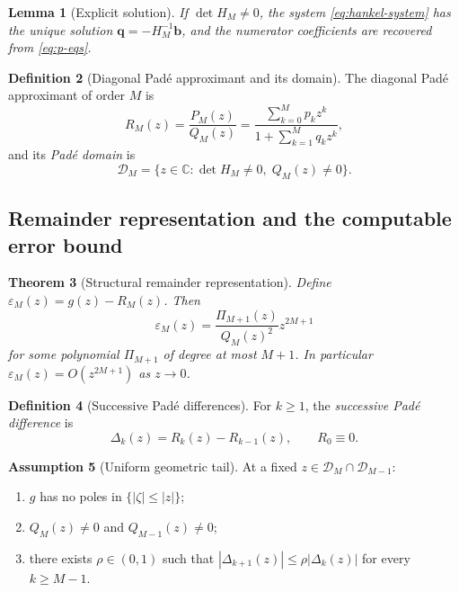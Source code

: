 \documentclass[11pt]{article}
\newtheorem{theorem}{Theorem}[section]
\newtheorem{lemma}[theorem]{Lemma}
\theoremstyle{definition}
\newtheorem{definition}[theorem]{Definition}
\newtheorem{assumption}[theorem]{Assumption}
\theoremstyle{remark}
\begin{document}
\begin{lemma}[Explicit solution]
\label{lem:explicit}
If $\det H_{M}\ne 0$, the system \eqref{eq:hankel-system} has the unique solution $\bm{q}=-H_{M}^{-1}\bm{b}$, and the numerator coefficients are recovered from \eqref{eq:p-eqs}.
\end{lemma}

\begin{definition}[Diagonal Pad\'e approximant and its domain]
\label{def:pade-domain}
The diagonal Pad\'e approximant of order $M$ is
\begin{equation}
R_{M}(z)=\frac{P_{M}(z)}{Q_{M}(z)}=\frac{\sum_{k=0}^{M}p_{k}z^{k}}{1+\sum_{k=1}^{M}q_{k}z^{k}},
\label{eq:RM}
\end{equation}
and its \emph{Pad\'e domain} is
\begin{equation}
\mathcal{D}_{M}=\{z\in\mathbb{C}:\det H_{M}\ne 0,\;Q_{M}(z)\ne 0\}.
\label{eq:DM}
\end{equation}
\end{definition}

\subsection{Remainder representation and the computable error bound}
\label{sec:heston-error}

\begin{theorem}[Structural remainder representation]
\label{thm:remainder-structure}
Define $\varepsilon_{M}(z)=g(z)-R_{M}(z)$. Then
\begin{equation}
\varepsilon_{M}(z)=\frac{\Pi_{M+1}(z)}{Q_{M}(z)^{2}}z^{2M+1}
\label{eq:remainder-structure}
\end{equation}
for some polynomial $\Pi_{M+1}$ of degree at most $M+1$. In particular $\varepsilon_{M}(z)=O(z^{2M+1})$ as $z\to 0$.
\end{theorem}

\begin{definition}[Successive Pad\'e differences]
\label{def:differences}
For $k\ge 1$, the \emph{successive Pad\'e difference} is
\begin{equation}
\Delta_{k}(z)=R_{k}(z)-R_{k-1}(z),
\qquad R_{0}\equiv 0.
\label{eq:Delta}
\end{equation}
\end{definition}

\begin{assumption}[Uniform geometric tail]
\label{ass:geometric-tail}
At a fixed $z\in\mathcal{D}_{M}\cap\mathcal{D}_{M-1}$:
\begin{enumerate}[label=(\roman*)]
\item $g$ has no poles in $\{|\zeta|\le|z|\}$;
\item $Q_{M}(z)\ne 0$ and $Q_{M-1}(z)\ne 0$;
\item there exists $\rho\in(0,1)$ such that $|\Delta_{k+1}(z)|\le\rho|\Delta_{k}(z)|$ for every $k\ge M-1$.
\end{enumerate}
\end{assumption}
\end{document}
